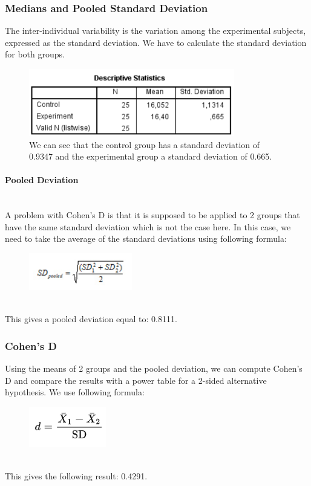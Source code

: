 \documentclass[14]{article}
\begin{document}
\subsubsection{Medians and Pooled Standard Deviation}
The inter-individual variability is the variation among the experimental subjects, expressed as the standard deviation. We have to calculate the standard deviation for both groups.

\begin{figure}[!htb]
	\includegraphics[width=0.8\textwidth]{img/question3/StandardDeviation.PNG}
	\captionsetup{width=1.0\textwidth}
	\centering 
	\caption{We can see that the control group has a standard deviation of 0.9347 and the experimental group a standard deviation of 0.665. }
\end{figure}

\paragraph{Pooled Deviation}\mbox{}\\
A problem with Cohen's D is that it is supposed to be applied to 2 groups that have the same standard deviation which is not the case here. In this case, we need to take the average of the standard deviations using following formula:
\begin{figure}[!htb]
	\includegraphics[width=0.4\textwidth]{img/question3/PooledDeviation.PNG}
	\captionsetup{width=1.0\textwidth}
	\centering 
\end{figure}\\
This gives a pooled deviation equal to: 0.8111.


\subsubsection{Cohen's D}
Using the means of 2 groups and the pooled deviation, we can compute Cohen's D and compare the results with a power table for a 2-sided alternative hypothesis.
We use following formula:
\begin{figure}[!htb]
	\includegraphics[width=0.3\textwidth]{img/question3/HomerD.PNG}
	\captionsetup{width=1.0\textwidth}
	\centering 
\end{figure}\\
This gives the following result: 0.4291.
\end{document}
